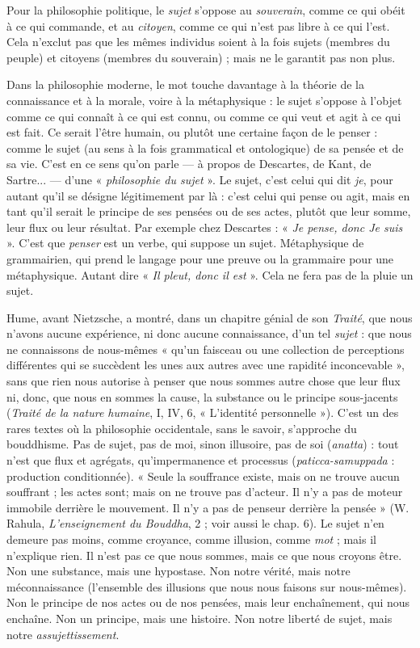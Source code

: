 Pour la philosophie politique, le {\it sujet} s'oppose au {\it souverain}, comme ce qui
obéit à ce qui commande, et au {\it citoyen}, comme ce qui n’est pas libre à ce qui
l'est. Cela n'exclut pas que les mêmes individus soient à la fois sujets (membres
du peuple) et citoyens (membres du souverain) ; mais ne le garantit pas non
plus.

Dans la philosophie moderne, le mot touche davantage à la théorie de la
connaissance et à la morale, voire à la métaphysique : le sujet s’oppose à l’objet
comme ce qui connaît à ce qui est connu, ou comme ce qui veut et agit à ce qui
est fait. Ce serait l’être humain, ou plutôt une certaine façon de le penser :
comme le sujet (au sens à la fois grammatical et ontologique) de sa pensée et de
sa vie. C’est en ce sens qu’on parle — à propos de Descartes, de Kant, de
Sartre... — d’une « {\it philosophie du sujet} ». Le sujet, c’est celui qui dit {\it je}, pour
autant qu'il se désigne légitimement par là : c’est celui qui pense ou agit, mais
en tant qu'il serait le principe de ses pensées ou de ses actes, plutôt que leur
somme, leur flux ou leur résultat. Par exemple chez Descartes : « {\it Je pense, donc
Je suis} ». C’est que {\it penser} est un verbe, qui suppose un sujet. Métaphysique de
grammairien, qui prend le langage pour une preuve ou la grammaire pour une
métaphysique. Autant dire « {\it Il pleut, donc il est} ». Cela ne fera pas de la pluie
un sujet.

Hume, avant Nietzsche, a montré, dans un chapitre génial de son {\it Traité},
que nous n’avons aucune expérience, ni donc aucune connaissance, d’un tel
{\it sujet} : que nous ne connaissons de nous-mêmes « qu’un faisceau ou une collection
de perceptions différentes qui se succèdent les unes aux autres avec une
rapidité inconcevable », sans que rien nous autorise à penser que nous sommes
autre chose que leur flux ni, donc, que nous en sommes la cause, la substance
ou le principe sous-jacents ({\it Traité de la nature humaine}, I, IV, 6, « L'identité
personnelle »). C’est un des rares textes où la philosophie occidentale, sans le
savoir, s'approche du bouddhisme. Pas de sujet, pas de moi, sinon illusoire, pas
de soi ({\it anatta}) : tout n’est que flux et agrégats, qu’impermanence et processus
({\it paticca-samuppada} : production conditionnée). « Seule la souffrance existe,
mais on ne trouve aucun souffrant ; les actes sont; mais on ne trouve pas
d’acteur. Il n’y a pas de moteur immobile derrière le mouvement. Il n’y a pas
de penseur derrière la pensée » (W. Rahula, {\it L'enseignement du Bouddha}, 2 ; voir
aussi le chap. 6). Le sujet n’en demeure pas moins, comme croyance, comme
illusion, comme {\it mot} ; mais il n’explique rien. Il n’est pas ce que nous sommes,
mais ce que nous croyons être. Non une substance, mais une hypostase. Non
notre vérité, mais notre méconnaissance (l’ensemble des illusions que nous
nous faisons sur nous-mêmes). Non le principe de nos actes ou de nos pensées,
mais leur enchaînement, qui nous enchaîne. Non un principe, mais une histoire.
Non notre liberté de sujet, mais notre {\it assujettissement}.

